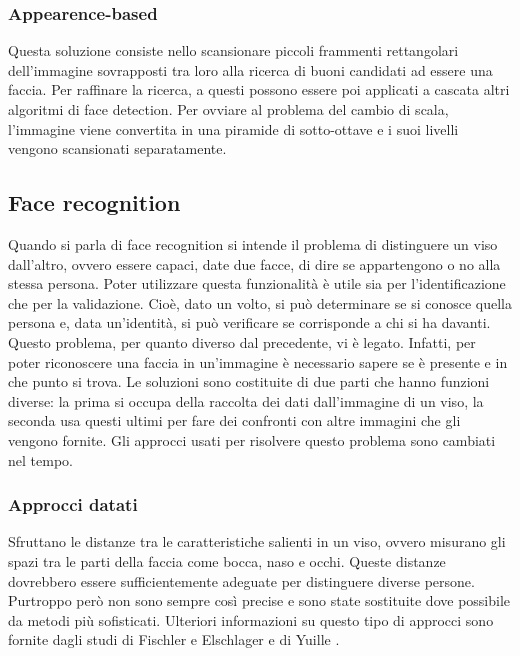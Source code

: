 \documentclass[italian, twoside]{sapthesis} %
\begin{document}
\subsubsection{Appearence-based}
Questa soluzione consiste nello scansionare piccoli frammenti rettangolari dell’immagine sovrapposti tra loro alla ricerca di buoni candidati ad essere una faccia. Per raffinare la ricerca, a questi possono essere poi applicati a cascata altri algoritmi di face detection. Per ovviare al problema del cambio di scala, l’immagine viene convertita in una piramide di sotto-ottave e i suoi livelli vengono scansionati separatamente.

\subsection{Face recognition}
Quando si parla di face recognition si intende il problema di distinguere un viso dall’altro, ovvero essere capaci, date due facce, di dire se appartengono o no alla stessa persona. Poter utilizzare questa funzionalità è utile sia per l’identificazione che per la validazione. Cioè, dato un volto, si può determinare se si conosce quella persona e, data un’identità, si può verificare se corrisponde a chi si ha davanti. Questo problema, per quanto diverso dal precedente, vi è legato. Infatti, per poter riconoscere una faccia in un’immagine è necessario sapere se è presente e in che punto si trova. Le soluzioni sono costituite di due parti che hanno funzioni diverse: la prima si occupa della raccolta dei dati dall’immagine di un viso, la seconda usa questi ultimi per fare dei confronti con altre immagini che gli vengono fornite. Gli approcci usati per risolvere questo problema sono cambiati nel tempo.

\subsubsection{Approcci datati}
Sfruttano le distanze tra le caratteristiche salienti in un viso, ovvero misurano gli spazi tra le parti della faccia come bocca, naso e occhi. Queste distanze dovrebbero essere sufficientemente adeguate per distinguere diverse persone. Purtroppo però non sono sempre così precise e sono state sostituite dove possibile da metodi più sofisticati. Ulteriori informazioni su questo tipo di approcci sono fornite dagli studi di Fischler e Elschlager \cite{fischler1973representation} e di Yuille \cite{yuille1991deformable}.
\end{document}
